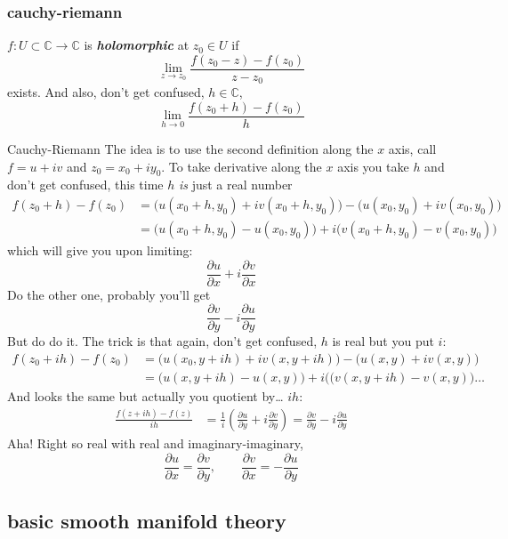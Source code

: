 \subsubsection{cauchy-riemann}

\(f:U \subset \mathbb{C} \to \mathbb{C}\) is \textit{\textbf{holomorphic}} at \(z_0\in U\) if
\[\lim_{z \to z_0} \frac{f(z_0-z)-f(z_0)}{z-z_0}\]
exists. And also, don't get confused, \(h\in \mathbb{C}\),
\[\lim_{h \to 0} \frac{f(z_0+h)-f(z_0)}{h}\]

\begin{thing7}{Cauchy-Riemann}\leavevmode
The idea is to use the second definition along the \(x\) axis, call \(f=u+iv\) and  \(z_0=x_0+iy_0\). To take derivative along the \(x\) axis you take \(h\) and don't get confused, this time \(h\) \textit{is} just a real number
\begin{align*}f(z_0+h)-f(z_0)&=\Big(u(x_0+h,y_0)+iv(x_0+h,y_0)\Big)-\Big(u(x_0,y_0)+iv(x_0,y_0)\Big)\\
&=\Big(u(x_0+h,y_0)-u(x_0,y_0)\Big)+i\Big(v(x_0+h,y_0)-v(x_0,y_0)\Big)
\end{align*}
which will give you upon limiting:
\[\frac{\partial u}{\partial x}+i\frac{\partial v}{\partial x}\]
Do the other one, probably you'll get
\[\frac{\partial v}{\partial y}-i\frac{\partial u}{\partial y}\]
But do do it. The trick is that again, don't get confused, \(h\) is real but you put \(i\):
\begin{align*}
f(z_0+ih)-f(z_0)&=\Big(u(x_0,y+ih)+iv(x,y+ih)\Big)-\Big(u(x,y)+iv(x,y)\Big)\\
&=\Big(u(x,y+ih)-u(x,y)\Big)+i\Big((v(x,y+ih)-v(x,y)\Big)\ldots
\end{align*}
And looks the same but actually you quotient by… \(ih\):
\begin{align*}\frac{f(z+ih)-f(z)}{ih}&=\frac{1}{i}\left(\frac{\partial u}{\partial y}+i\frac{\partial v}{\partial y}\right)=\frac{\partial v}{\partial y}-i\frac{\partial u}{\partial y}
	\end{align*}
Aha! Right so real with real and imaginary-imaginary,
\[\frac{\partial u}{\partial x}=\frac{\partial v}{\partial y},\qquad \frac{\partial v}{\partial x}=-\frac{\partial u}{\partial y}\]




\end{thing7}

\subsection{basic smooth manifold theory}

